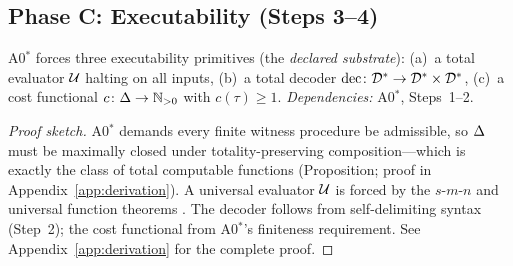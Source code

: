 \subsection{Phase C: Executability (Steps 3--4)}
\label{sec:derivation:executability}

\begin{theorem}
\label{thm:executability}
A0$^*$ forces three executability primitives (the \emph{declared substrate}):
(a)~a total evaluator $\mathcal{U}$ halting on all inputs,
(b)~a total decoder $\mathrm{dec} \colon \mathcal{D}^* \to \mathcal{D}^* \times \mathcal{D}^*$,
(c)~a cost functional $c \colon \Delta \to \mathbb{N}_{>0}$ with $c(\tau) \geq 1$.
\emph{Dependencies:} A0$^*$, Steps~1--2.
\begin{proof}[Proof sketch]
A0$^*$ demands every finite witness procedure be admissible, so $\Delta$ must be maximally closed under totality-preserving composition---which is exactly the class of total computable functions (Proposition; proof in Appendix~\ref{app:derivation}).  A universal evaluator $\mathcal{U}$ is forced by the $s$-$m$-$n$ and universal function theorems \citep{rogers1967}.  The decoder follows from self-delimiting syntax (Step~2); the cost functional from A0$^*$'s finiteness requirement.
See Appendix~\ref{app:derivation} for the complete proof.
\end{proof}
\end{theorem}

